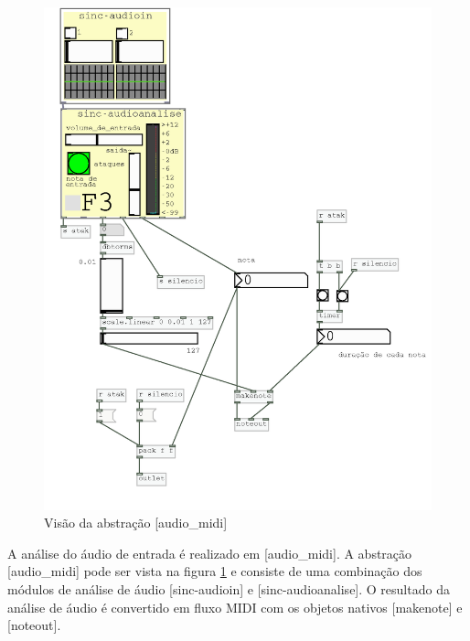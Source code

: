 \documentclass[draft]{ppgmus}
\begin{document}
\begin{figure}
\includegraphics[scale=.6]{audio-midi}
\caption{Visão da abstração [audio\_midi]}
\label{audio-midi}
\end{figure}

A análise do áudio de entrada é realizado em [audio\_midi].
A abstração [audio\_midi] pode ser vista na figura \ref{audio-midi} e consiste
de uma combinação dos módulos de análise de áudio [sinc-audioin] e [sinc-audioanalise].
O resultado da análise de áudio é convertido em fluxo MIDI com os objetos nativos 
[makenote] e [noteout]. 
\end{document}
